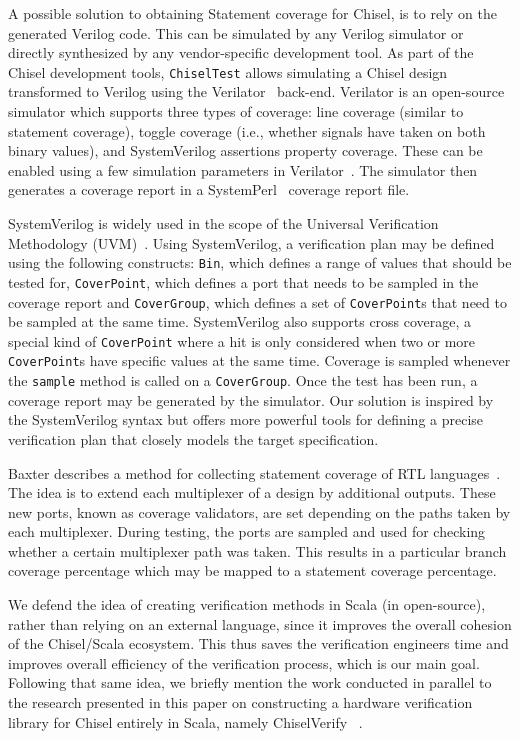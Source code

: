 \documentclass[conference]{IEEEtran}
\begin{document}
A possible solution to obtaining Statement coverage for Chisel, is to rely on the generated Verilog code. 
This can be simulated by any Verilog simulator or directly synthesized by any vendor-specific development tool. 
As part of the Chisel development tools, \texttt{ChiselTest} allows simulating a Chisel design transformed to Verilog using the Verilator~\cite{verilator} back-end.
Verilator is an open-source simulator which supports three types of coverage: line coverage (similar to statement coverage), toggle coverage (i.e., whether signals have taken on both binary values), and SystemVerilog assertions property coverage. 
These can be enabled using a few simulation parameters in Verilator~\cite{tolotto2020}.
The simulator then generates a coverage report in a SystemPerl~\cite{SystemPerl} coverage report file.

SystemVerilog is widely used in the scope of the Universal Verification Methodology (UVM)~\cite{uvm2015}. 
Using SystemVerilog, a verification plan may be defined using the following constructs: \texttt{Bin}, which defines a range of values that should be tested for, \texttt{CoverPoint}, which defines a port that needs to be sampled in the coverage report and \texttt{CoverGroup}, which defines a set of \texttt{CoverPoint}s that need to be sampled at the same time. 
SystemVerilog also supports cross coverage, a special kind of \texttt{CoverPoint} where a hit is only considered when two or more \texttt{CoverPoint}s have specific values at the same time.
Coverage is sampled whenever the \texttt{sample} method is called on a \texttt{CoverGroup}. 
Once the test has been run, a coverage report may be generated by the simulator. 
Our solution is inspired by the SystemVerilog syntax but offers more powerful tools for defining a precise verification plan that closely models the target specification.

Baxter describes a method for collecting statement coverage of RTL languages~\cite{branch-cov-made-easy:2002}. The idea is to extend each multiplexer of a design by additional outputs. These new ports, known as coverage validators, are set depending on the paths taken by each multiplexer. During testing, the ports are sampled and used for checking whether a certain multiplexer path was taken. This results in a particular branch coverage percentage which may be mapped to a statement coverage percentage.

We defend the idea of creating verification methods in Scala (in open-source), rather than relying on an external language, since it improves the overall cohesion of the Chisel/Scala ecosystem. 
This thus saves the verification engineers time and improves overall efficiency of the verification process, which is our main goal. 
Following that same idea, we briefly mention the work conducted in parallel to the research presented in this paper on constructing a hardware verification library for Chisel entirely in Scala, namely ChiselVerify~\cite{blind} %
.
\end{document}

